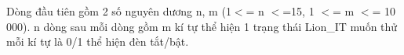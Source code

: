 Dòng đầu tiên gồm 2 số nguyên dương n, m (1$<$= n $<$=15, 1 $<$= m $<$= 10 000). n dòng sau mỗi dòng gồm m kí tự thể hiện 1 trạng thái Lion\_IT muốn thử mỗi kí tự là 0/1 thể hiện đèn tắt/bật.